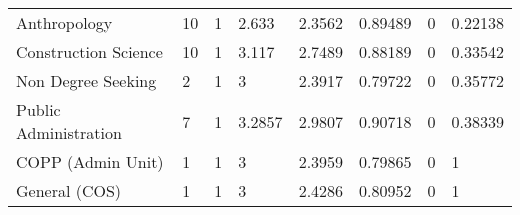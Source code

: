 \begin{sidewaystable}
{\begin{longtable}{llllllll}
Anthropology & 10 & 1 & 2.633 & 2.3562 & 0.89489 & 0 & 0.22138 \\ 
Construction Science & 10 & 1 & 3.117 & 2.7489 & 0.88189 & 0 & 0.33542 \\ 
Non Degree Seeking & 2 & 1 & 3 & 2.3917 & 0.79722 & 0 & 0.35772 \\ 
Public Administration & 7 & 1 & 3.2857 & 2.9807 & 0.90718 & 0 & 0.38339 \\ 
COPP  (Admin Unit) & 1 & 1 & 3 & 2.3959 & 0.79865 & 0 & 1 \\ 
General (COS) & 1 & 1 & 3 & 2.4286 & 0.80952 & 0 & 1 \\ 
\hline 
\end{longtable}} 
\end{sidewaystable}


%
